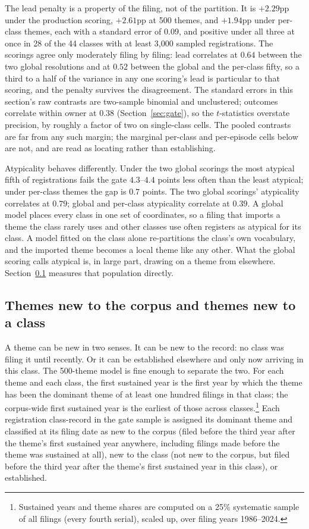 The lead penalty is a property of the filing, not of the partition. It is
$+2.29$pp under the production scoring, $+2.61$pp at 500 themes, and
$+1.94$pp under per-class themes, each with a standard error of $0.09$, and
positive under all three at once in 28 of the 44 classes with at least
3{,}000 sampled registrations. The scorings agree
only moderately filing by filing: lead correlates at $0.64$ between the two
global resolutions and at $0.52$ between the global and the per-class fifty,
so a third to a half of the variance in any one scoring's lead is particular
to that scoring, and the penalty survives the disagreement. The standard errors in
this section's raw contrasts are two-sample binomial and unclustered;
outcomes correlate within owner at $0.38$ (Section~\ref{sec:gate}), so the
$t$-statistics overstate precision, by roughly a factor of two on
single-class cells. The pooled contrasts are far from any such margin; the
marginal per-class and per-episode cells below are not, and are read as
locating rather than establishing.

Atypicality behaves differently. Under the two global scorings the most
atypical fifth of registrations fails the gate $4.3$--$4.4$ points less
often than the least atypical; under per-class themes the gap is $0.7$
points. The two global scorings' atypicality correlates at $0.79$; global
and per-class atypicality correlate at $0.39$. A global model places every
class in one set of coordinates, so a filing that imports a theme the class
rarely uses and other classes use often registers as atypical for its
class. A model fitted on the class alone re-partitions the class's own
vocabulary, and the imported theme becomes a local theme like any other.
What the global scoring calls atypical is, in large part, drawing on a
theme from elsewhere. Section~\ref{sec:novelty_origin} measures that
population directly.

\subsection{Themes new to the corpus and themes new to a class}\label{sec:novelty_origin}

A theme can be new in two senses. It can be new to the record: no class was
filing it until recently. Or it can be established elsewhere and only now
arriving in this class. The 500-theme model is fine enough to separate the
two. For each theme and each class, the first sustained year is the first
year by which the theme has been the dominant theme of at least one hundred
filings in that class; the corpus-wide first sustained year is the earliest
of those across classes.\footnote{Sustained years and theme shares are
computed on a 25\% systematic sample of all filings (every fourth serial),
scaled up, over filing years 1986--2024.} Each registration class-record in the gate sample
is assigned its dominant theme and classified at its filing date as new to
the corpus (filed before the third year after the theme's first sustained
year anywhere, including filings made before the theme was sustained at
all), new to the class (not new to the corpus, but filed before the third
year after the theme's first sustained year in this class), or
established.

